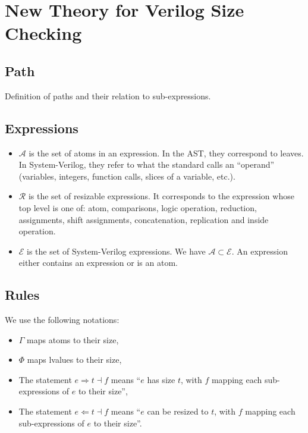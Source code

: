 \documentclass{article}
\renewcommand{\S}{\ensuremath{\Rightarrow}}
\newcommand{\C}{\ensuremath{\Leftarrow}}
\newcommand{\s}[3]{#1 \S{} #2 \dashv{} #3}
\renewcommand{\c}[3]{#1 \C{} #2 \dashv{} #3}
\begin{document}
\section*{New Theory for Verilog Size Checking}

\subsection*{Path}
Definition of paths and their relation to sub-expressions.

\subsection*{Expressions}

\begin{itemize}
	\item $\mathcal{A}$ is the set of atoms in an expression. In the AST, they
	      correspond to leaves. In System-Verilog, they refer to what the standard
	      calls an ``operand'' (variables, integers, function calls, slices of a
	      variable, etc.).
	\item $\mathcal{R}$ is the set of resizable expressions. It corresponds to the
	      expression whose top level is one of: atom, comparisons, logic
	      operation, reduction, assignments, shift assignments, concatenation,
	      replication and inside operation.
	\item $\mathcal{E}$ is the set of System-Verilog expressions. We have
	      $\mathcal{A} \subset \mathcal{E}$. An expression either contains an
	      expression or is an atom.
\end{itemize}

\subsection*{Rules}
We use the following notations:
\begin{itemize}
	\item $\Gamma$ maps atoms to their size,
	\item $\Phi$ maps lvalues to their size,
	\item The statement $\s{e}{t}{f}$ means ``$e$ has size $t$, with $f$ mapping
	      each sub-expressions of $e$ to their size'',
	\item The statement $\c{e}{t}{f}$ means ``$e$ can be resized to $t$, with $f$
	      mapping each sub-expressions of $e$ to their size''.
\end{itemize}
\end{document}
